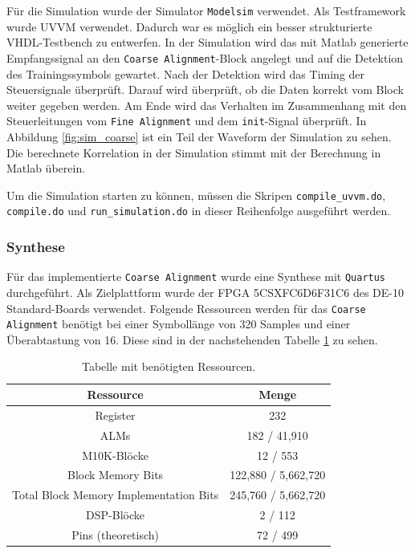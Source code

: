 Für die Simulation wurde der Simulator \texttt{Modelsim} verwendet. Als Testframework wurde UVVM verwendet. Dadurch war es möglich ein besser strukturierte VHDL-Testbench zu entwerfen. In der Simulation wird das mit Matlab generierte Empfangssignal an den \texttt{Coarse Alignment}-Block angelegt und auf die Detektion des Trainingssymbols gewartet. Nach der Detektion wird das Timing der Steuersignale überprüft. Darauf wird überprüft, ob die Daten korrekt vom Block weiter gegeben werden. Am Ende wird das Verhalten im Zusammenhang mit den Steuerleitungen vom \texttt{Fine Alignment} und dem \texttt{init}-Signal überprüft. In Abbildung \ref{fig:sim_coarse} ist ein Teil der Waveform der Simulation zu sehen. Die berechnete Korrelation in der Simulation stimmt mit der Berechnung in Matlab überein.

\begin{center}
\end{center}

Um die Simulation starten zu können, müssen die Skripen \texttt{compile\_uvvm.do}, \texttt{compile.do} und \texttt{run\_simulation.do} in dieser Reihenfolge ausgeführt werden.

\subsubsection{Synthese}
Für das implementierte \texttt{Coarse Alignment} wurde eine Synthese mit \texttt{Quartus} durchgeführt. Als Zielplattform wurde der FPGA 5CSXFC6D6F31C6 des DE-10 Standard-Boards verwendet. Folgende Ressourcen werden für das \texttt{Coarse Alignment} benötigt bei einer Symbollänge von 320 Samples und einer Überabtastung von 16.
Diese sind in der nachstehenden Tabelle \ref{tab:resources_coarse} zu sehen.

\begin{table}[H]
\centering
\begin{tabular}{|c|c|}
\hline
\textbf{Ressource} & \textbf{Menge} \\ \hline
Register & 232 \\ \hline
ALMs & 182 / 41,910 \\ \hline
M10K-Blöcke & 12 / 553 \\ \hline
Block Memory Bits & 122,880 / 5,662,720 \\ \hline
Total Block Memory Implementation Bits & 245,760 / 5,662,720 \\ \hline
DSP-Blöcke & 2 / 112 \\ \hline
Pins (theoretisch) & 72 / 499 \\ \hline
\end{tabular}
\caption{Tabelle mit benötigten Ressourcen.}
\label{tab:resources_coarse}
\end{table}

